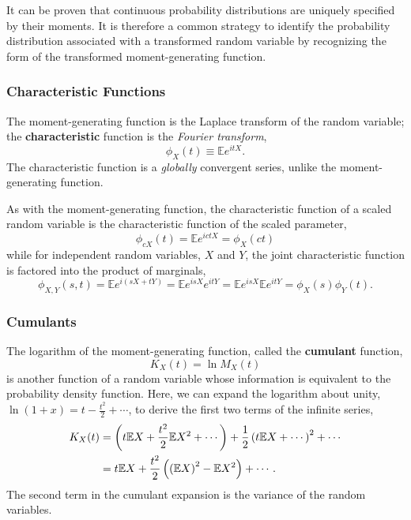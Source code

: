 \documentclass[12pt, twoside, draft]{article}
\begin{document}
It can be proven that continuous probability distributions are uniquely specified by their moments.  It is therefore a common strategy to identify the probability distribution associated with a transformed random variable by recognizing the form of the transformed moment-generating function.

\subsubsection{Characteristic Functions}\label{sec:characteristic_functions}
The moment-generating function is the Laplace transform of the random variable; the \textbf{characteristic} function is the \textit{Fourier transform},
\begin{equation}
\phi_X(t) \equiv \mathbb{E}e^{itX}.
\end{equation}
The characteristic function is a \textit{globally} convergent series, unlike the moment-generating function.

As with the moment-generating function, the characteristic function of a scaled random variable is the characteristic function of the scaled parameter,
\begin{equation}
\phi_{cX}(t) = \mathbb{E}e^{ictX} = \phi_X(ct)
\end{equation}
while for independent random variables, $X$ and $Y$, the joint characteristic function is factored into the product of marginals,
\begin{equation}
\phi_{X,Y}(s, t) = \mathbb{E}e^{i(sX+tY)} = \mathbb{E}e^{isX}e^{itY} = \mathbb{E}e^{isX}\mathbb{E}e^{itY} = \phi_X(s)\phi_Y(t).
\end{equation}

\subsubsection{Cumulants}\label{sec:cumulants}
The logarithm of the moment-generating function, called the \textbf{cumulant} function,
\begin{equation}
K_X(t) = \ln M_X(t)
\end{equation}
is another function of a random variable whose information is equivalent to the probability density function.  Here, we can expand the logarithm about unity, $\ln(1+x) = t - \frac{t^2}{2} + \cdots$, to derive the first two terms of the infinite series,
\begin{align}
K_X(t) &= \left( t\mathbb{E}X + \frac{t^2}{2}\mathbb{E}X^2 + \cdots \right) + \frac{1}{2} \left( t\mathbb{E}X + \cdots \right)^2 + \cdots \notag \\
&= t\mathbb{E}X + \frac{t^2}{2} \left(\left(\mathbb{E}X \right)^2 - \mathbb{E}X^2 \right) + \cdots.
\end{align}
The second term in the cumulant expansion is the variance of the random variables.
\end{document}
